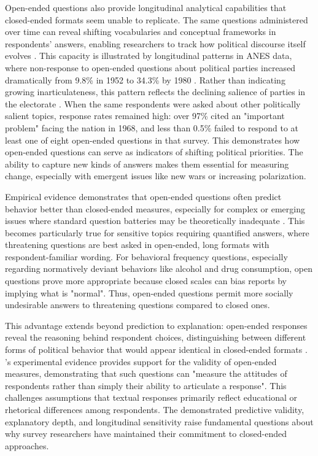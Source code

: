 \documentclass[
  journal=ram,
  manuscript=article-type,
  year=2025,
  volume=unpublished,
]{cup-journal}
\begin{document}
Open-ended questions also provide longitudinal analytical capabilities that closed-ended formats seem unable to replicate.
The same questions administered over time can reveal shifting vocabularies and conceptual frameworks in respondents’ answers, enabling researchers to track how political discourse itself evolves \citep{geer88}.
This capacity is illustrated by longitudinal patterns in ANES data, where non-response to open-ended questions about political parties increased dramatically from 9.8\% in 1952 to 34.3\% by 1980 \citep{geer88}.
Rather than indicating growing inarticulateness, this pattern reflects the declining salience of parties in the electorate \citep{wattenberg84, geer88}.
When the same respondents were asked about other politically salient topics, response rates remained high: over 97\% cited an "important problem" facing the nation in 1968, and less than 0.5\% failed to respond to at least one of eight open-ended questions in that survey.
This demonstrates how open-ended questions can serve as indicators of shifting political priorities.
The ability to capture new kinds of answers makes them essential for measuring change, especially with emergent issues like new wars or increasing polarization.

Empirical evidence demonstrates that open-ended questions often predict behavior better than closed-ended measures, especially for complex or emerging issues where standard question batteries may be theoretically inadequate \citep{blair_etal77, singer_couper17}.
This becomes particularly true for sensitive topics requiring quantified answers, where threatening questions are best asked in open-ended, long formats with respondent-familiar wording.
For behavioral frequency questions, especially regarding normatively deviant behaviors like alcohol and drug consumption, open questions prove more appropriate because closed scales can bias reports by implying what is "normal".
Thus, open-ended questions permit more socially undesirable answers to threatening questions compared to closed ones.

This advantage extends beyond prediction to explanation: open-ended responses reveal the reasoning behind respondent choices, distinguishing between different forms of political behavior that would appear identical in closed-ended formats \citep{schuman08, lazarsfeld44}.
\citet{geer88}'s experimental evidence provides support for the validity of open-ended measures, demonstrating that such questions can "measure the attitudes of respondents rather than simply their ability to articulate a response".
This challenges assumptions that textual responses primarily reflect educational or rhetorical differences among respondents.
The demonstrated predictive validity, explanatory depth, and longitudinal sensitivity raise fundamental questions about why survey researchers have maintained their commitment to closed-ended approaches.
\end{document}
